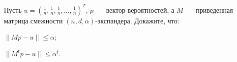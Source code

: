 Пусть $u = (\frac{1}{n}, \frac{1}{n}, \frac{1}{n}, \dots, \frac{1}{n})^{T}$, $p$~--- вектор вероятностей, а $M$~---
приведенная матрица смежности $(n, d, \alpha)$-экспандера.  Докажите, что:
\begin{enumcyr}
    \item $\|M p - u\| \le \alpha$;
    \item $\|M^t p - u\| \le \alpha^t$.
\end{enumcyr}
